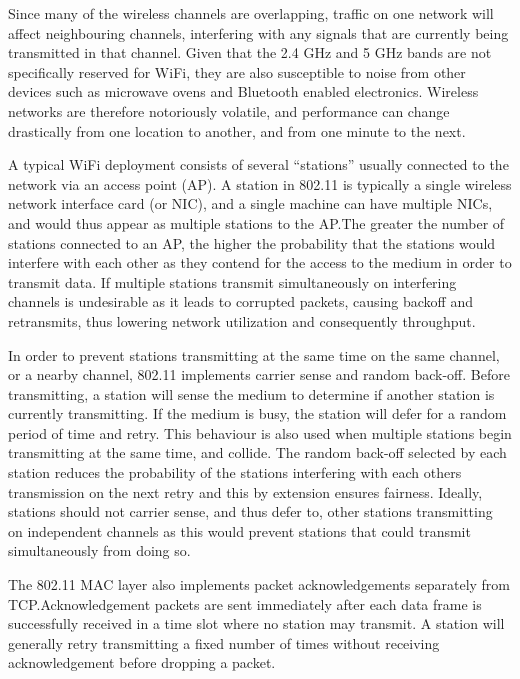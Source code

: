 Since many of the wireless channels are overlapping, traffic on one network will
affect neighbouring channels, interfering with any signals that are currently
being transmitted in that channel. Given that the 2.4 GHz and 5 GHz bands are
not specifically reserved for WiFi, they are also susceptible to noise from
other devices such as microwave ovens and Bluetooth enabled electronics.
Wireless networks are therefore notoriously volatile, and performance can change
drastically from one location to another, and from one minute to the next.

A typical WiFi deployment consists of several ``stations'' usually connected to
the network via an access point (AP). A station in 802.11 is typically a single
wireless network interface card (or NIC), and a single machine can have multiple
NICs, and would thus appear as multiple stations to the AP.\@ The greater the
number of stations connected to an AP, the higher the probability that the
stations would interfere with each other as they contend for the access to the
medium in order to transmit data. If multiple stations transmit simultaneously
on interfering channels is undesirable as it leads to corrupted packets, causing
backoff and retransmits, thus lowering network utilization and consequently
throughput.

In order to prevent stations transmitting at the same time on the same channel,
or a nearby channel, 802.11 implements carrier sense and random back-off. Before
transmitting, a station will sense the medium to determine if another station is
currently transmitting. If the medium is busy, the station will defer for a
random period of time and retry. This behaviour is also used when multiple
stations begin transmitting at the same time, and collide. The random back-off
selected by each station reduces the probability of the stations interfering
with each others transmission on the next retry and this by extension ensures
fairness. Ideally, stations should not carrier sense, and thus defer to, other
stations transmitting on independent channels as this would prevent stations
that could transmit simultaneously from doing so.

The 802.11 MAC layer also implements packet acknowledgements separately from
TCP.\@ Acknowledgement packets are sent immediately after each data frame is
successfully received in a time slot where no station may transmit. A station
will generally retry transmitting a fixed number of times without receiving
acknowledgement before dropping a packet.

